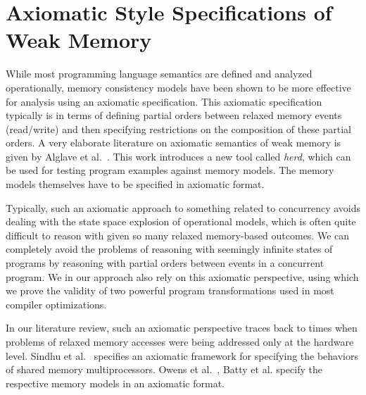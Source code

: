 \section{Axiomatic Style Specifications of Weak Memory}

While most programming language semantics are defined and analyzed operationally, memory consistency models have been shown to be more effective for analysis using an axiomatic specification.
This axiomatic specification typically is in terms of defining partial orders between relaxed memory events (read/write) and then specifying restrictions on the composition of these partial orders. 
A very elaborate literature on axiomatic semantics of weak memory is given by Alglave et al.~\cite{Alglave}. 
This work introduces a new tool called \textit{herd}, which can be used for testing program examples against memory models. The memory models themselves have to be specified in axiomatic format. 

Typically, such an axiomatic approach to something related to concurrency avoids dealing with the state space explosion of operational models, which is often quite difficult to reason with given so many relaxed memory-based outcomes. 
We can completely avoid the problems of reasoning with seemingly infinite states of programs by reasoning with partial orders between events in a concurrent program.
We in our approach also rely on this axiomatic perspective, using which we prove the validity of two powerful program transformations used in most compiler optimizations. 

In our literature review, such an axiomatic perspective traces back to times when problems of relaxed memory accesses were being addressed only at the hardware level. 
Sindhu et al.~\cite{Sindhu} specifies an axiomatic framework for specifying the behaviors of shared memory multiprocessors. 
Owens et al.~\cite{OwensS}, Batty et al.\cite{BattyM} specify the respective memory models in an axiomatic format. 




